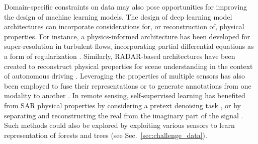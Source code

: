 \documentclass{CUP-JNL-DTM}%
\newcommand{\AOc}[1]{\textcolor{cyan}{[\textbf{Art}: #1]}}
\theoremstyle{definition}
\numberwithin{equation}{section}
\begin{document}
Domain-specific constraints on data may also pose opportunities for improving the design of machine learning models. 
The design of deep learning model architectures can incorporate considerations for, or reconstruction of, physical properties. 
For instance, a physics-informed architecture has been developed for super-resolution in turbulent flows, incorporating partial differential equations as a form of regularization \cite{jiang_meshfreeflownet_2020}. 
Similarly, RADAR-based architectures have been created to reconstruct physical properties for scene understanding in the context of autonomous driving \cite{ouaknine_multi-view_2021, rebut_raw_2022}.
%
Leveraging the properties of multiple sensors has also been employed to fuse their representations \cite{ouaknine_deep_2022} or to generate annotations from one modality to another \cite{ouaknine_carrada_2021, schiefer_uav-based_2023}.
%
In remote sensing, self-supervised learning has benefited from SAR physical properties by considering a pretext denoising task \cite{dalsasso_sar2sar_2021, meraoumia_multitemporal_2023}, or by separating and reconstructing the real from the imaginary part of the signal \cite{dalsasso_as_2022}.
Such methods could also be explored by exploiting various sensors to learn representation of forests and trees (see Sec.~\ref{sec:challenge_data}).

%



%
%
%
\end{document}
